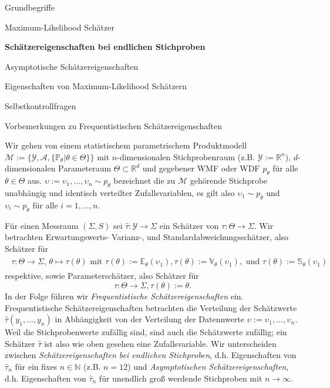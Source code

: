 \documentclass[
  8pt,
  ignorenonframetext,
]{beamer}
\newcommand{\ups} {\upsilon}
\begin{document}
\begin{frame}{}
\protect\hypertarget{section-8}{}
\large
\vfill
{}

Grundbegriffe

Maximum-Likelihood Schätzer

\textbf{Schätzereigenschaften bei endlichen Stichproben}

Asymptotische Schätzereigenschaften

Eigenschaften von Maximum-Likelihood Schätzern

Selbstkontrollfragen \vfill
\end{frame}

\begin{frame}{}
\protect\hypertarget{section-9}{}
Vorbemerkungen zu Frequentistischen Schätzereigenschaften

\footnotesize

Wir gehen von einem statistischem parametrischem Produktmodell
\(\mathcal{M} := \{\mathcal{Y},\mathcal{A}, \{\mathbb{P}_\theta| \theta \in \Theta\}\}\)
mit \(n\)-dimensionalen Stichprobenraum (z.B.
\(\mathcal{Y} := \mathbb{R}^n\)), \(d\)-dimensionalen Parameteraum
\(\Theta \subset \mathbb{R}^d\) und gegebener WMF oder WDF \(p_\theta\)
für alle \(\theta \in \Theta\) aus.
\(\ups := \ups_1,...,\ups_n \sim p_\theta\) bezeichnet die zu
\(\mathcal{M}\) gehörende Stichprobe unabhängig und identisch verteilter
Zufallsvariablen, es gilt also \(\ups_1 \sim p_\theta\) und
\(\ups_i \sim p_\theta\) für alle \(i = 1,...,n\).

Für einen Messraum \((\Sigma,S)\) sei
\(\hat{\tau} : \mathcal{Y} \to \Sigma\) ein Schätzer von
\(\tau : \Theta \to \Sigma\). Wir betrachten Erwartungswerts- Varianz-,
und Standardabweichungsschätzer, also Schätzer für \begin{align}
\begin{split}
\tau : \Theta \to \Sigma,\,
\theta \mapsto \tau(\theta)
\mbox{ mit }
\tau(\theta) := \mathbb{E}_\theta(\ups_1),
\tau(\theta) := \mathbb{V}_\theta(\ups_1), \mbox{ und }
\tau(\theta) := \mathbb{S}_\theta(\ups_1)
\end{split}
\end{align} respektive, sowie Parameterschätzer, also Schätzer für
\begin{equation}
\tau: \Theta \to \Sigma, \tau(\theta) := \theta.
\end{equation} In der Folge führen wir \emph{Frequentistische
Schätzereigenschaften} ein. Frequentistische Schätzereigenschaften
betrachten die Verteilung der Schätzwerte \(\hat{\tau}(y_1,...,y_n)\) in
Abhängigkeit von der Verteilung der Datennwerte
\(\ups := \ups_1,...,\ups_n\). Weil die Stichprobenwerte zufällig sind,
sind auch die Schätzwerte zufällig; ein Schätzer \(\hat{\tau}\) ist also
wie oben gesehen eine Zufallsvariable. Wir unterscheiden zwischen
\emph{Schätzereigenschaften bei endlichen Stichproben}, d.h.
Eigenschaften von \(\hat{\tau}_n\) für ein fixes \(n \in \mathbb{N}\)
(z.B. \(n = 12\)) und \emph{Asymptotischen Schätzereigenschaften}, d.h.
Eigenschaften von \(\hat{\tau}_n\) für unendlich groß werdende
Stichproben mit \(n \to \infty\).
\end{frame}
\end{document}
